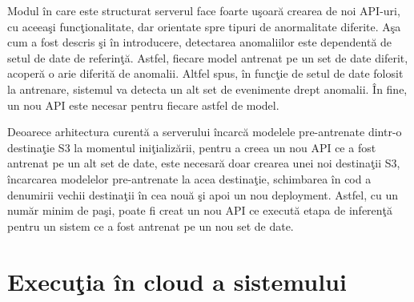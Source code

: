 \documentclass[a4paper,12pt]{report}
\begin{document}
\par Modul în care este structurat serverul face foarte uşoară crearea de noi API-uri, cu aceeaşi funcţionalitate, dar orientate spre tipuri de anormalitate diferite. Aşa cum a fost descris şi în introducere, detectarea anomaliilor este dependentă de setul de date de referinţă. Astfel, fiecare model antrenat pe un set de date diferit, acoperă o arie diferită de anomalii. Altfel spus, în funcţie de setul de date folosit la antrenare, sistemul va detecta un alt set de evenimente drept anomalii. În fine, un nou API este necesar pentru fiecare astfel de model. 
\par Deoarece arhitectura curentă a serverului încarcă modelele pre-antrenate dintr-o destinaţie S3 la momentul iniţializării, pentru a creea un nou API ce a fost antrenat pe un alt set de date, este necesară doar crearea unei noi destinaţii S3, încarcarea modelelor pre-antrenate la acea destinaţie, schimbarea în cod a denumirii vechii destinaţii în cea nouă şi apoi un nou deployment. Astfel, cu un număr minim de paşi, poate fi creat un nou API ce execută etapa de inferenţă pentru un sistem ce a fost antrenat pe un nou set de date.

\chapter{Execuţia în cloud a sistemului}
\end{document}
